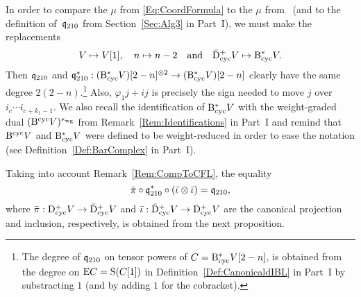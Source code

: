 \documentclass[\MainFolder/Text.tex]{subfiles}
\begin{document}
\begin{Remark}\label{Rem:CompToCFL}
In order to compare the $\mu$ from \eqref{Eq:CoordFormula} to the $\mu$ from~\cite[Section~10]{Cieliebak2015} (and to the definition of~$\mathfrak{q}_{210}$ from Section~\ref{Sec:Alg3} in Part~I), we must make the replacements
$$ V\mapsto V[1], \quad  n \mapsto n - 2\quad\text{and}\quad\bar{\mathrm{D}}^+_{\mathrm{cyc}} V\mapsto \mathrm{B}_{\mathrm{cyc}}^* V. $$
Then $\mathfrak{q}_{210}$ and $\mathfrak{q}^*_{210}: (\mathrm{B}_{\mathrm{cyc}}^* V)[2-n]^{\otimes 2} \rightarrow (\mathrm{B}_{\mathrm{cyc}}^* V)[2-n]$ clearly have the same degree $2(2-n)$.\footnote{The degree of $\mathfrak{q}_{210}$ on tensor powers of $C = \mathrm{B}_{\mathrm{cyc}}^* V [2-n]$, is obtained from the degree on $\mathrm{E} C = \mathrm{S}(C[1])$ in Definition~\ref{Def:CanonicaldIBL} in Part~I by substracting $1$ (and by adding $1$ for the cobracket).} Also, $\varphi_1 j + i j$ is precisely the sign needed to move $j$ over $i_{c}\dotsb i_{c+k_1-1}$. We also recall the identification of $\mathrm{B}_{\mathrm{cyc}}^* V$ with the weight-graded dual $(\mathrm{B}^{\mathrm{cyc}} V)^{*_{\mathrm{wg}}}$ from Remark~\ref{Rem:Identifications} in Part~I and remind that $\mathrm{B}^{\mathrm{cyc}} V$ and $\mathrm{B}_{\mathrm{cyc}}^* V$ were defined to be weight-reduced in order to ease the notation (see Definition~\ref{Def:BarComplex} in Part~I).
\end{Remark}

Taking into account Remark~\ref{Rem:CompToCFL}, the equality
$$ \bar{\pi}\circ \mathfrak{q}_{210}^*\circ (\bar{\iota}\otimes\bar{\iota}) = \mathfrak{q}_{210}, $$
where $\bar{\pi}: \mathrm{D}^+_{\mathrm{cyc}} V \rightarrow \bar{\mathrm{D}}^+_{\mathrm{cyc}} V$ and $\bar{\iota}: \bar{\mathrm{D}}^+_{\mathrm{cyc}} V \rightarrow \mathrm{D}^+_{\mathrm{cyc}} V$ are the canonical projection and inclusion, respectively, is obtained from the next proposition.
\end{document}
